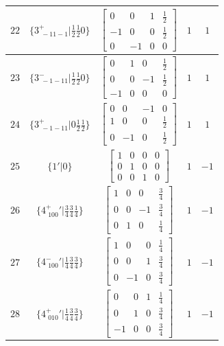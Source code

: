 \documentclass[fleqn,8pt]{jsarticle}
\begin{document}
\begin{longtable}{ccccc}
$ 22 $ & $ \{3^{+}_{\,\,-11-1}|\frac{1}{2} \frac{1}{2} 0\} $ & $ \begin{bmatrix} 0 & 0 & 1 & \frac{1}{2} \\ -1 & 0 & 0 & \frac{1}{2} \\ 0 & -1 & 0 & 0 \end{bmatrix} $ & $ 1 $ & $ 1 $ \\ \hline
$ 23 $ & $ \{3^{-}_{\,\,-1-11}|\frac{1}{2} \frac{1}{2} 0\} $ & $ \begin{bmatrix} 0 & 1 & 0 & \frac{1}{2} \\ 0 & 0 & -1 & \frac{1}{2} \\ -1 & 0 & 0 & 0 \end{bmatrix} $ & $ 1 $ & $ 1 $ \\ \hline
$ 24 $ & $ \{3^{+}_{\,\,-1-11}|0 \frac{1}{2} \frac{1}{2}\} $ & $ \begin{bmatrix} 0 & 0 & -1 & 0 \\ 1 & 0 & 0 & \frac{1}{2} \\ 0 & -1 & 0 & \frac{1}{2} \end{bmatrix} $ & $ 1 $ & $ 1 $ \\ \hline
$ 25 $ & $ \{1{}'|0\} $ & $ \begin{bmatrix} 1 & 0 & 0 & 0 \\ 0 & 1 & 0 & 0 \\ 0 & 0 & 1 & 0 \end{bmatrix} $ & $ 1 $ & $ -1 $ \\ \hline
$ 26 $ & $ \{4^{+}_{\,\,100}{}'|\frac{3}{4} \frac{3}{4} \frac{1}{4}\} $ & $ \begin{bmatrix} 1 & 0 & 0 & \frac{3}{4} \\ 0 & 0 & -1 & \frac{3}{4} \\ 0 & 1 & 0 & \frac{1}{4} \end{bmatrix} $ & $ 1 $ & $ -1 $ \\ \hline
$ 27 $ & $ \{4^{-}_{\,\,100}{}'|\frac{1}{4} \frac{3}{4} \frac{3}{4}\} $ & $ \begin{bmatrix} 1 & 0 & 0 & \frac{1}{4} \\ 0 & 0 & 1 & \frac{3}{4} \\ 0 & -1 & 0 & \frac{3}{4} \end{bmatrix} $ & $ 1 $ & $ -1 $ \\ \hline
$ 28 $ & $ \{4^{+}_{\,\,010}{}'|\frac{1}{4} \frac{3}{4} \frac{3}{4}\} $ & $ \begin{bmatrix} 0 & 0 & 1 & \frac{1}{4} \\ 0 & 1 & 0 & \frac{3}{4} \\ -1 & 0 & 0 & \frac{3}{4} \end{bmatrix} $ & $ 1 $ & $ -1 $ \\ \hline

\end{longtable}
\end{document}
